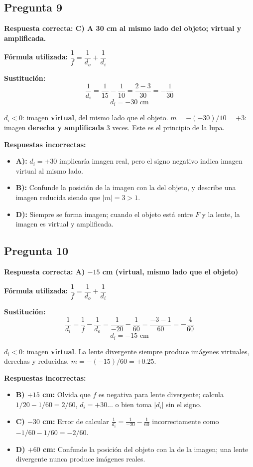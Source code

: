 \begin{respuestabox}
\subsection*{Pregunta 9}
\textcolor{verdecorrecto}{\textbf{Respuesta correcta: C) A 30 cm al mismo lado del objeto; virtual y amplificada.}}

\textbf{Fórmula utilizada:} $\dfrac{1}{f} = \dfrac{1}{d_o} + \dfrac{1}{d_i}$

\textbf{Sustitución:}
$$\frac{1}{d_i} = \frac{1}{15} - \frac{1}{10} = \frac{2-3}{30} = -\frac{1}{30}$$
$$d_i = -30 \text{ cm}$$

$d_i < 0$: imagen \textbf{virtual}, del mismo lado que el objeto. $m = -(-30)/10 = +3$: imagen \textbf{derecha y amplificada} 3 veces. Este es el principio de la lupa.

\textbf{Respuestas incorrectas:}
\begin{itemize}
    \item \textbf{A):} $d_i = +30$ implicaría imagen real, pero el signo negativo indica imagen virtual al mismo lado.
    \item \textbf{B):} Confunde la posición de la imagen con la del objeto, y describe una imagen reducida siendo que $|m|=3>1$.
    \item \textbf{D):} Siempre se forma imagen; cuando el objeto está entre $F$ y la lente, la imagen es virtual y amplificada.
\end{itemize}
\end{respuestabox}
\newpage
\begin{respuestabox}
\subsection*{Pregunta 10}
\textcolor{verdecorrecto}{\textbf{Respuesta correcta: A) $-15$ cm (virtual, mismo lado que el objeto)}}

\textbf{Fórmula utilizada:} $\dfrac{1}{f} = \dfrac{1}{d_o} + \dfrac{1}{d_i}$

\textbf{Sustitución:}
$$\frac{1}{d_i} = \frac{1}{f} - \frac{1}{d_o} = \frac{1}{-20} - \frac{1}{60} = \frac{-3-1}{60} = -\frac{4}{60}$$
$$d_i = -15 \text{ cm}$$

$d_i < 0$: imagen \textbf{virtual}. La lente divergente siempre produce imágenes virtuales, derechas y reducidas. $m = -(-15)/60 = +0.25$.

\textbf{Respuestas incorrectas:}
\begin{itemize}
    \item \textbf{B) $+15$ cm:} Olvida que $f$ es negativa para lente divergente; calcula $1/20 - 1/60 = 2/60$, $d_i = +30$... o bien toma $|d_i|$ sin el signo.
    \item \textbf{C) $-30$ cm:} Error de calcular $\frac{1}{d_i} = \frac{1}{-20} - \frac{1}{60}$ incorrectamente como $-1/60 - 1/60 = -2/60$.
    \item \textbf{D) $+60$ cm:} Confunde la posición del objeto con la de la imagen; una lente divergente nunca produce imágenes reales.
\end{itemize}
\end{respuestabox}
